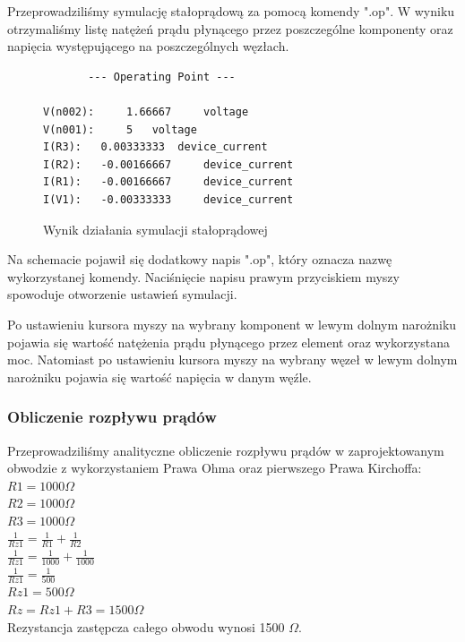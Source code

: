 \documentclass[polish,polish,a4paper]{article}
\begin{document}
Przeprowadziliśmy symulację stałoprądową za pomocą komendy ".op". W wyniku otrzymaliśmy listę natężeń prądu płynącego przez poszczególne komponenty oraz napięcia występującego na poszczególnych węzłach. 

\begin{figure}[H]
\centering
\begin{verbatim}
       --- Operating Point ---

V(n002):	 1.66667	 voltage
V(n001):	 5	 voltage
I(R3):	 0.00333333	 device_current
I(R2):	 -0.00166667	 device_current
I(R1):	 -0.00166667	 device_current
I(V1):	 -0.00333333	 device_current
\end{verbatim}
\caption{Wynik działania symulacji stałoprądowej}
\end{figure}

Na schemacie pojawił się dodatkowy napis ".op", który oznacza nazwę wykorzystanej komendy. Naciśnięcie napisu prawym przyciskiem myszy spowoduje otworzenie ustawień symulacji.

Po ustawieniu kursora myszy na wybrany komponent w lewym dolnym narożniku pojawia się wartość natężenia prądu płynącego przez element oraz wykorzystana moc. Natomiast po ustawieniu kursora myszy na wybrany węzeł w lewym dolnym narożniku pojawia się wartość napięcia w danym węźle.

\subsubsection{Obliczenie rozpływu prądów}
Przeprowadziliśmy analityczne obliczenie rozpływu prądów w zaprojektowanym obwodzie z wykorzystaniem Prawa Ohma oraz pierwszego Prawa Kirchoffa: \\
$R1 = 1000 \Omega$ \\
$R2 = 1000 \Omega$ \\
$R3 = 1000 \Omega$ \\
$\frac{1}{Rz1} = \frac{1}{R1} + \frac{1}{R2}$ \\
$\frac{1}{Rz1} = \frac{1}{1000} + \frac{1}{1000}$ \\
$\frac{1}{Rz1} = \frac{1}{500}$ \\
$Rz1 = 500 \Omega$ \\
$Rz = Rz1 + R3 = 1500 \Omega$ \\
Rezystancja zastępcza całego obwodu wynosi 1500 $\Omega$. \\
\end{document}
